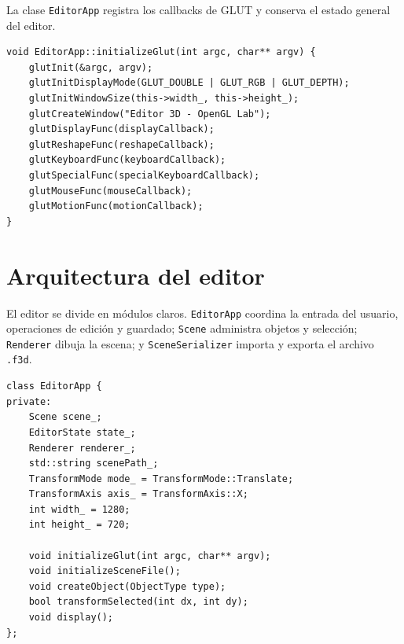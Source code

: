 \documentclass[a4paper,12pt]{article}
\begin{document}
La clase \texttt{EditorApp} registra los callbacks de GLUT y conserva el estado general del editor.

\begin{lstlisting}
void EditorApp::initializeGlut(int argc, char** argv) {
    glutInit(&argc, argv);
    glutInitDisplayMode(GLUT_DOUBLE | GLUT_RGB | GLUT_DEPTH);
    glutInitWindowSize(this->width_, this->height_);
    glutCreateWindow("Editor 3D - OpenGL Lab");
    glutDisplayFunc(displayCallback);
    glutReshapeFunc(reshapeCallback);
    glutKeyboardFunc(keyboardCallback);
    glutSpecialFunc(specialKeyboardCallback);
    glutMouseFunc(mouseCallback);
    glutMotionFunc(motionCallback);
}
\end{lstlisting}

\section{Arquitectura del editor}

El editor se divide en módulos claros. \texttt{EditorApp} coordina la entrada del usuario, operaciones de edición y guardado; \texttt{Scene} administra objetos y selección; \texttt{Renderer} dibuja la escena; y \texttt{SceneSerializer} importa y exporta el archivo \texttt{.f3d}.


\begin{lstlisting}
class EditorApp {
private:
    Scene scene_;
    EditorState state_;
    Renderer renderer_;
    std::string scenePath_;
    TransformMode mode_ = TransformMode::Translate;
    TransformAxis axis_ = TransformAxis::X;
    int width_ = 1280;
    int height_ = 720;

    void initializeGlut(int argc, char** argv);
    void initializeSceneFile();
    void createObject(ObjectType type);
    bool transformSelected(int dx, int dy);
    void display();
};
\end{lstlisting}
\end{document}
